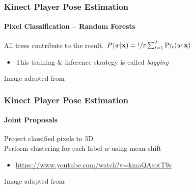 \documentclass[xetex,professionalfont]{beamer}
\renewcommand{\vec}[1]{\ensuremath{\mathbf{#1}}}
\newcommand{\vx}{\vec{x}}
\begin{document}

\begin{frame}
\frametitle{Kinect Player Pose Estimation}
\framesubtitle{Pixel Classification -- Random Forests}

All trees contribute to the result, $P(w|\vx)=\sfrac{1}{T}\sum_{t=1}^T \Pr_t(w|\vx)$
\begin{itemize}
    \item This training \& inference strategy is called \emph{bagging}
\end{itemize}

\bigskip
\begin{center}
    {\centering Image adapted from \cite{shotton2011}}
\end{center}

\end{frame}


\begin{frame}
\frametitle{Kinect Player Pose Estimation}
\framesubtitle{Joint Proposals}

Project classified pixels to 3D\\\medskip
Perform clustering for each label $w$ using mean-shift %
\begin{itemize}
    \item \url{https://www.youtube.com/watch?v=kmaQAsotT9s}
\end{itemize}

\bigskip
\begin{center}
    {\centering Image adapted from \cite{shotton2011}}
\end{center}

\end{frame}
\end{document}
